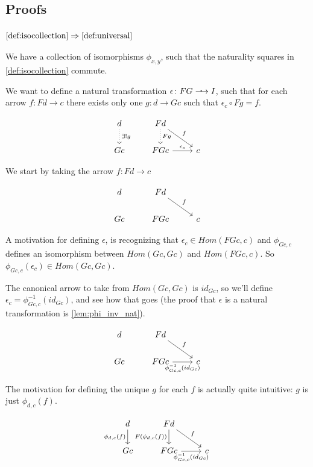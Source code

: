 \documentclass[]{article}
\newcommand{\dotarrow}{%
	\mathrel{\ooalign{\hss\raise.65ex\hbox{\scalebox{1.25}{\normalfont .}}%
	\kern0.35ex\hss\cr$\longrightarrow$}}}
\begin{document}
\subsection{Proofs}
\subsubsection{$\ref{def:isocollection} \Rightarrow \ref{def:universal}$}
We have a collection of isomorphisms $\phi_{x,y}$, such that the naturality squares in \ref{def:isocollection} commute.

We want to define a natural transformation $\epsilon \colon FG \dotarrow I$, such that for each arrow $f \colon Fd \to c$ there exists only one $g \colon d \to G c$ such that $\epsilon_c \circ F g = f$.

\[
\begin{tikzcd}
d \arrow[d, dotted, "\exists! g"] & F d \arrow[d, dotted, "F g"] \arrow[rd, "f"] \\ Gc & FGc \arrow[r, "\epsilon_c"] & c
\end{tikzcd}
\]

We start by taking the arrow $f \colon Fd \to c$

\[
\begin{tikzcd}
d & F d \arrow[rd, "f"] \\ Gc & FGc & c
\end{tikzcd}
\]

A motivation for defining $\epsilon$, is recognizing that $\epsilon_c \in Hom(FGc, c)$ and $\phi_{Gc,c}$ defines an isomorphism between $Hom(Gc,Gc)$ and $Hom(FGc,c)$. So $\phi_{Gc,c}(\epsilon_c) \in Hom(Gc,Gc)$.

The canonical arrow to take from $Hom(Gc,Gc)$ is $id_{Gc}$, so we'll define $\epsilon_c = \phi_{Gc,c}^{-1}(id_{Gc})$, and see how that goes (the proof that $\epsilon$ is a natural transformation is \cref{lem:phi_inv_nat}).

\[
\begin{tikzcd}
d & F d \arrow[rd, "f"] \\ Gc & FGc \arrow[r, swap, "\phi_{Gc,c}^{-1}(id_{Gc})"] & c
\end{tikzcd}
\]

The motivation for defining the unique $g$ for each $f$ is actually quite intuitive: $g$ is just $\phi_{d,c}(f)$.

\[
\begin{tikzcd}
d \arrow[d, swap, "\phi_{d,c}(f)"] & F d  \arrow[d, swap, "F (\phi_{d,c}(f))"] \arrow[rd, "f"] \\ Gc & FGc \arrow[r, swap, "\phi_{Gc,c}^{-1}(id_{Gc})"] & c
\end{tikzcd}
\]
\end{document}
